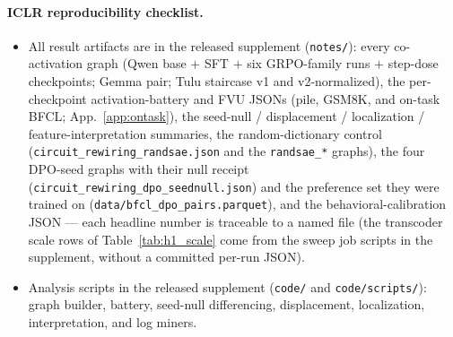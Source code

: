 \documentclass{article}
\begin{document}
\paragraph{ICLR reproducibility checklist.}
\begin{itemize}[leftmargin=*]
\item All result artifacts are in the released supplement (\texttt{notes/}): every co-activation graph (Qwen base $+$ SFT $+$ six GRPO-family runs $+$ step-dose checkpoints; Gemma pair; Tulu staircase v1 and v2-normalized), the per-checkpoint activation-battery and FVU JSONs (pile, GSM8K, and on-task BFCL; App.~\ref{app:ontask}), the seed-null / displacement / localization / feature-interpretation summaries, the random-dictionary control (\texttt{circuit\_rewiring\_randsae.json} and the \texttt{randsae\_*} graphs), the four DPO-seed graphs with their null receipt (\texttt{circuit\_rewiring\_dpo\_seednull.json}) and the preference set they were trained on (\texttt{data/bfcl\_dpo\_pairs.parquet}), and the behavioral-calibration JSON --- each headline number is traceable to a named file (the transcoder scale rows of Table~\ref{tab:h1_scale} come from the sweep job scripts in the supplement, without a committed per-run JSON).
\item Analysis scripts in the released supplement (\texttt{code/} and \texttt{code/scripts/}): graph builder, battery, seed-null differencing, displacement, localization, interpretation, and log miners.

\end{itemize}
\end{document}

